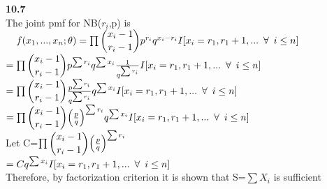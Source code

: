 

{\bf 10.7}\\

The joint pmf for NB($r_i$,p) is \\

$ \quad f(x_1,...,x_n; \mathbf{\theta}) = \prod \dbinom{x_i - 1}{r_i - 1} p^{r_i} q^{x_i - r_i} I[x_i = r_1, r_1 + 1,... \enskip \forall \enskip i\le n]$\\

$ = \prod \dbinom{x_i - 1}{r_i - 1} p^{\sum{r_i}} q^{\sum{x_i}} \frac{1}{q^{\sum{r_i}}} I[x_i = r_1, r_1 + 1,... \enskip \forall \enskip i\le n]$\\

$ = \prod \dbinom{x_i - 1}{r_i - 1} \frac{p^{\sum{r_i}}}{q^{\sum{r_i}}} q^{\sum{x_i}} I[x_i = r_1, r_1 + 1,... \enskip \forall \enskip i\le n]$\\

$ = \prod \dbinom{x_i - 1}{r_i - 1} \Big(\frac{p}{q}\Big)^{\sum{r_i}} q^{\sum{x_i}} I[x_i = r_1, r_1 + 1,... \enskip \forall \enskip i\le n]$\\

Let C=$ \prod \dbinom{x_i - 1}{r_i - 1} \Big(\frac{p}{q}\Big)^{\sum{r_i}}$ \\

$ = C q^{\sum{x_i}} I[x_i = r_1, r_1 + 1,... \enskip \forall \enskip i\le n]$\\

Therefore, by factorization criterion it is shown that S=$\sum{X_i}$ is sufficient\\

